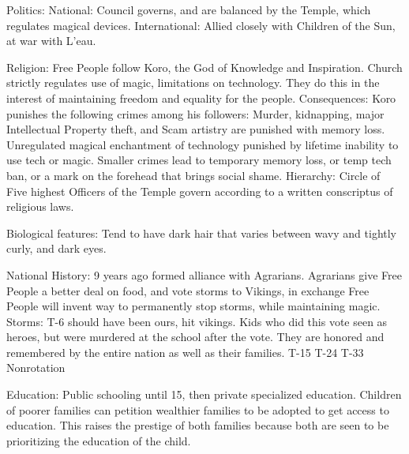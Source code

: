 \documentclass[blue]{GL2020}
\begin{document}
Politics:
	National: Council governs, and are balanced by the Temple, which regulates magical devices.
	International:  Allied closely with Children of the Sun, at war with L'eau.
	
Religion:		Free People follow Koro, the God of Knowledge and Inspiration.  Church strictly regulates use of
						magic, limitations on technology.  They do this in the interest of maintaining freedom and 
						equality for the people.  
	Consequences:  Koro punishes the following crimes among his followers:  Murder, kidnapping, major 
						Intellectual Property theft, and Scam artistry are punished with memory loss.  Unregulated 
						magical enchantment of technology punished by lifetime inability to use tech or magic.  
						Smaller crimes lead to temporary memory loss, or temp tech ban, or a mark on the forehead 
						that brings social shame.
	Hierarchy:  Circle of Five highest Officers of the Temple govern according to a written conscriptus of
						religious laws.
	
	
Biological features:	Tend to have dark hair that varies between wavy and tightly curly, and dark eyes.

National History:		9 years ago formed alliance with Agrarians.  Agrarians give Free People a better deal on food, and vote storms to Vikings, in exchange Free People will invent way to permanently stop storms, while maintaining magic.  %
	Storms:		T-6 should have been ours, hit vikings.  Kids who did this vote seen as heroes, but were murdered at the school after the vote.  They are honored and remembered by the entire nation as well as their families. %
						T-15
						T-24
						T-33
						Nonrotation
	
Education:	Public schooling until 15, then private specialized education.  Children of poorer families can petition wealthier families to be adopted to get access to education. This raises the prestige of both families because both are seen to be prioritizing the education of the child.
\end{document}
